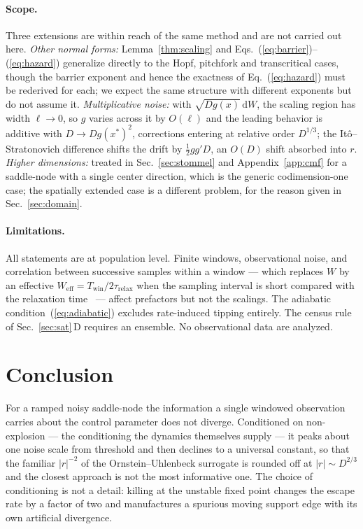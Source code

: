 \documentclass[%
 twocolumn,
 superscriptaddress,
 amsmath,amssymb,
 aps,
 pre,
 floatfix,
]{revtex4-2}
\newcommand{\dd}{\mathrm{d}}
\begin{document}
\paragraph{Scope.}
Three extensions are within reach of the same method and are not carried out here.  \emph{Other normal forms:} Lemma~\ref{thm:scaling} and Eqs.~(\ref{eq:barrier})--(\ref{eq:hazard}) generalize directly to the Hopf, pitchfork and transcritical cases, though the barrier exponent and hence the exactness of Eq.~(\ref{eq:hazard}) must be rederived for each; we expect the same structure with different exponents but do not assume it.  \emph{Multiplicative noise:} with $\sqrt{Dg(x)}\,\dd W$, the scaling region has width $\ell\to0$, so $g$ varies across it by $O(\ell)$ and the leading behavior is additive with $D\to Dg(x^\ast)^2$, corrections entering at relative order $D^{1/3}$; the It\^o--Stratonovich difference shifts the drift by $\tfrac12gg'D$, an $O(D)$ shift absorbed into $r$.  \emph{Higher dimensions:} treated in Sec.~\ref{sec:stommel} and Appendix~\ref{app:cmf} for a saddle-node with a single center direction, which is the generic codimension-one case; the spatially extended case is a different problem, for the reason given in Sec.~\ref{sec:domain}.

\paragraph{Limitations.}
All statements are at population level.  Finite windows, observational noise, and correlation between successive samples within a window --- which replaces $W$ by an effective $W_{\mathrm{eff}}=T_{\mathrm{win}}/2\tau_{\mathrm{relax}}$ when the sampling interval is short compared with the relaxation time~\cite{Geyer1992} --- affect prefactors but not the scalings.  The adiabatic condition~(\ref{eq:adiabatic}) excludes rate-induced tipping entirely.  The census rule of Sec.~\ref{sec:sat}\,D requires an ensemble.  No observational data are analyzed.

\section{\label{sec:conc}Conclusion}

For a ramped noisy saddle-node the information a single windowed observation carries about the control parameter does not diverge.  Conditioned on non-explosion --- the conditioning the dynamics themselves supply --- it peaks about one noise scale from threshold and then declines to a universal constant, so that the familiar $|r|^{-2}$ of the Ornstein--Uhlenbeck surrogate is rounded off at $|r|\sim D^{2/3}$ and the closest approach is not the most informative one.  The choice of conditioning is not a detail: killing at the unstable fixed point changes the escape rate by a factor of two and manufactures a spurious moving support edge with its own artificial divergence.
\end{document}
